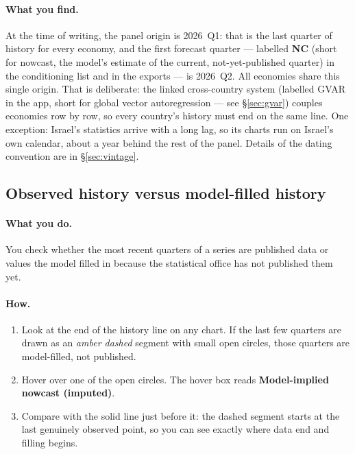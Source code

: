 \documentclass[11pt]{article}
\theoremstyle{definition}
\theoremstyle{remark}
\begin{document}
\paragraph{What you find.}
At the time of writing, the panel origin is 2026~Q1: that is the last quarter of
history for every economy, and the first forecast quarter --- labelled \textbf{NC}
(short for nowcast, the model's estimate of the current, not-yet-published
quarter) in the conditioning list and in the exports --- is 2026~Q2. All economies
share this single origin. That is deliberate: the linked cross-country system
(labelled GVAR in the app, short for global vector autoregression --- see
\S\ref{sec:gvar}) couples economies row by row, so every country's history must end
on the same line. One exception: Israel's statistics arrive with a long lag,
so its charts run on Israel's own calendar, about a year behind the rest of the
panel. Details of the dating convention are in \S\ref{sec:vintage}.

\subsection{Observed history versus model-filled history}

\paragraph{What you do.}
You check whether the most recent quarters of a series are published data or values
the model filled in because the statistical office has not published them yet.

\paragraph{How.}
\begin{enumerate}
  \item Look at the end of the history line on any chart. If the last few quarters
    are drawn as an \emph{amber dashed} segment with small open circles, those
    quarters are model-filled, not published.
  \item Hover over one of the open circles. The hover box reads
    \textbf{Model-implied nowcast (imputed)}.
  \item Compare with the solid line just before it: the dashed segment starts at
    the last genuinely observed point, so you can see exactly where data end and
    filling begins.
\end{enumerate}
\end{document}
